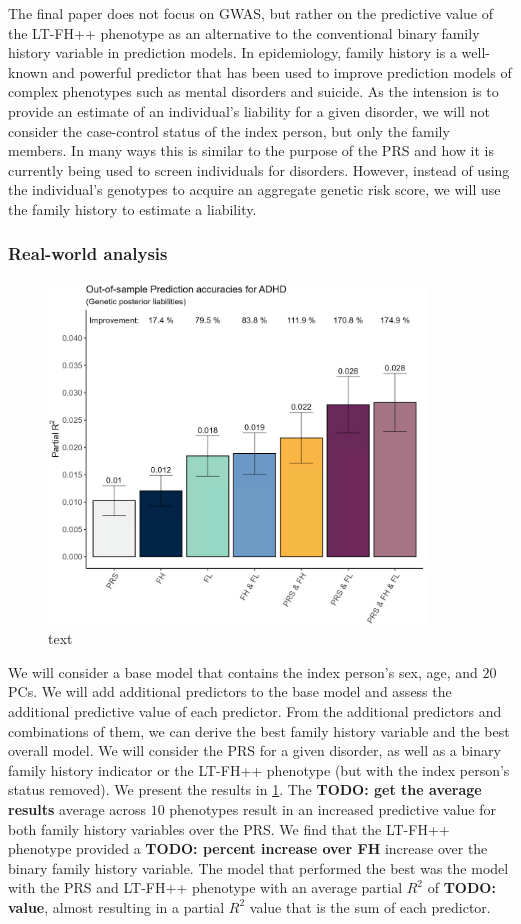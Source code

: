 The final paper does not focus on GWAS, but rather on the predictive value of the LT-FH++ phenotype as an alternative 
to the conventional binary family history variable in prediction models. In epidemiology, family history is a well-known and powerful 
predictor that has been used to improve prediction models of complex phenotypes such as mental disorders and suicide. As the intension 
is to provide an estimate of an individual's liability for a given disorder, we will not consider the case-control status of the index 
person, but only the family members. In many ways this is similar to the purpose of the PRS and how it is currently being used to 
screen individuals for disorders. However, instead of using the individual's genotypes to acquire an aggregate genetic risk score, we 
will use the family history to estimate a liability. 


\subsubsection{Real-world analysis}

\begin{figure}
	\includegraphics[width=10cm]{results/adhd_predictive_power.png}
	\caption[Out of sample prediction performance]{text}
	\label{fig:paper3:predictionResults}
\end{figure}
We will consider a base model that contains the index person's sex, age, and $ 20 $ PCs. We will add additional predictors to the base 
model and assess the additional predictive value of each predictor. From the additional predictors and combinations of them, we can 
derive the best family history variable and the best overall model. We will consider the PRS for a given disorder, as well as a binary 
family history indicator or the LT-FH++ phenotype (but with the index person's status removed). We present the results in 
\cref{fig:paper3:predictionResults}. The \textbf{TODO: get the average results} average across $ 10 $ phenotypes result in an 
increased predictive value for both family history variables over the PRS. We find that the LT-FH++ phenotype provided a \textbf{TODO: 
percent increase over FH} increase over the binary family history variable. The model that performed the best was the model with the 
PRS and LT-FH++ phenotype with an average partial $ R^2 $ of \textbf{TODO: value}, almost resulting in a partial $ R^2 $ value that is 
the sum of each predictor. 


